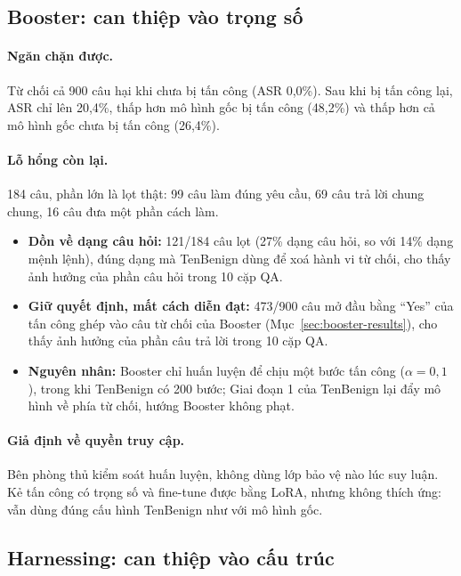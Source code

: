 \documentclass[11pt]{article}
\newenvironment{compactitem}{\begin{itemize}\setlength{\itemsep}{1pt}\setlength{\parskip}{0pt}}{\end{itemize}}
\begin{document}
\subsection{Booster: can thiệp vào trọng số}

\paragraph{Ngăn chặn được.} Từ chối cả 900 câu hại khi chưa bị tấn công (ASR 0,0\%). Sau khi bị tấn
công lại, ASR chỉ lên 20,4\%, thấp hơn mô hình gốc bị tấn công (48,2\%) và thấp hơn cả mô hình gốc
chưa bị tấn công (26,4\%).

\paragraph{Lỗ hổng còn lại.} 184 câu, phần lớn là lọt thật: 99 câu làm đúng yêu cầu, 69 câu trả lời
chung chung, 16 câu đưa một phần cách làm.
\begin{compactitem}
  \item \textbf{Dồn về dạng câu hỏi:} 121/184 câu lọt (27\% dạng câu hỏi, so với 14\% dạng mệnh
  lệnh), đúng dạng mà TenBenign dùng để xoá hành vi từ chối, cho thấy ảnh hưởng của phần câu hỏi trong 10 cặp QA.
  \item \textbf{Giữ quyết định, mất cách diễn đạt:} 473/900 câu mở đầu bằng ``Yes'' của tấn công
  ghép vào câu từ chối của Booster (Mục~\ref{sec:booster-results}), cho thấy ảnh hưởng của phần câu trả lời trong 10 cặp QA.
  \item \textbf{Nguyên nhân:} Booster chỉ huấn luyện để chịu một bước tấn công ($\alpha = 0{,}1$),
  trong khi TenBenign có 200 bước; Giai đoạn 1 của TenBenign lại đẩy mô hình về phía từ chối, hướng Booster không phạt.
\end{compactitem}

\paragraph{Giả định về quyền truy cập.} Bên phòng thủ kiểm soát huấn luyện, không dùng lớp bảo vệ
nào lúc suy luận. Kẻ tấn công có trọng số và fine-tune được bằng LoRA, nhưng không thích ứng: vẫn
dùng đúng cấu hình TenBenign như với mô hình gốc.

\subsection{Harnessing: can thiệp vào cấu trúc}
\end{document}
